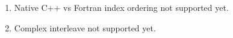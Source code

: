 

\begin{enumerate}

\item Native C++ vs Fortran index ordering not supported yet.
\item Complex interleave not supported yet.

\end{enumerate}


